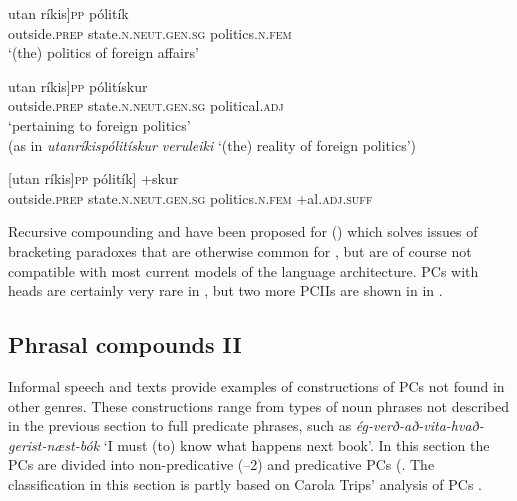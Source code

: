 \documentclass[output=paper]{LSP/langsci}
\begin{document}
\begin{xlist}
\ea%
 \label{ex:bjarnadottir:22} 
\ea \label{ex:bjarnadottir:22a} 
 \gll {\ob}utan ríkis]\textsc{pp} pólitík\\
 outside\textsc{.prep} state\textsc{.n.neut.gen.sg} politics\textsc{.n.fem}\\
\glt ‘(the) politics of foreign affairs’

\ex \label{ex:bjarnadottir:22b}
\gll {\ob}utan ríkis]\textsc{pp} pólitískur\\
 outside\textsc{.prep} state\textsc{.n.neut.gen.sg} political\textsc{.adj}\\
\glt ‘pertaining to foreign politics’\\
 (as in \textit{utanríkispólitískur veruleiki} ‘(the) reality of foreign politics’)

\ex \label{ex:bjarnadottir:22c}
\gll {\ob}[utan ríkis]\textsc{pp} pólitík] +skur\\
 outside\textsc{.prep} state\textsc{.n.neut.gen.sg} politics\textsc{.n.fem}  +al\textsc{.adj.suff}\\
\z
\z

Recursive compounding and  have been proposed for  (\citealt{Bjarnadóttir19962005}) which solves issues of bracketing paradoxes that are otherwise common for , but are of course not compatible with most current models of the language architecture. PCs with  heads are certainly very rare in , but two more PCIIs are shown in  in .

\subsection{Phrasal compounds II}\label{sec:bjarnadottir:3.2}

Informal speech and texts provide examples of constructions of PCs not found in other genres. These constructions range from types of noun phrases not described in the previous section to full predicate phrases, such as \textit{ég-verð-að-vita-hvað-gerist-næst-bók} ‘I must (to) know what happens next book’. In this section the PCs are divided into non-predicative (–2) and predicative PCs (. The classification in this section is partly based on Carola Trips' analysis of  PCs \citep{Trips2016}.


\end{xlist}
\end{document}
